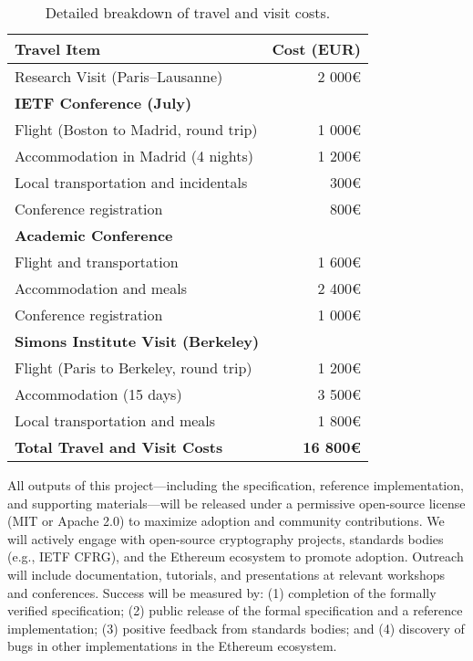 \documentclass{article}
\begin{document}
\begin{table}[t]
    \centering
    \caption{Detailed breakdown of travel and visit costs.}
    \begin{tabular}{|l|r|}
        \hline
        \textbf{Travel Item} & \textbf{Cost (EUR)} \\
        \hline\hline
        Research Visit (Paris--Lausanne) & 2 000\euro{} \\
        \hline
        \multicolumn{2}{|l|}{\textbf{IETF Conference (July)}} \\
        \hline
        Flight (Boston to Madrid, round trip) & 1 000\euro{} \\
        Accommodation in Madrid (4 nights) & 1 200\euro{} \\
        Local transportation and incidentals & 300\euro{} \\
        Conference registration & 800\euro{} \\
        \hline
        \multicolumn{2}{|l|}{\textbf{Academic Conference}} \\
        \hline
        Flight and transportation & 1 600\euro{} \\
        Accommodation and meals & 2 400\euro{} \\
        Conference registration & 1 000\euro{} \\
        \hline
        \multicolumn{2}{|l|}{\textbf{Simons Institute Visit (Berkeley)}} \\
        \hline
        Flight (Paris to Berkeley, round trip) & 1 200\euro{} \\
        Accommodation (15 days) & 3 500\euro{} \\
        Local transportation and meals & 1 800\euro{} \\
        \hline\hline
        \rowcolor{lightgray}
        \textbf{Total Travel and Visit Costs} & \textbf{16 800\euro{}} \\
        \hline
    \end{tabular}
\end{table}

 All outputs of this project—including the specification, reference implementation, and supporting materials—will be released under a permissive open-source license (MIT or Apache 2.0) to maximize adoption and community contributions. We will actively engage with open-source cryptography projects, standards bodies (e.g., IETF CFRG), and the Ethereum ecosystem to promote adoption. Outreach will include documentation, tutorials, and presentations at relevant workshops and conferences. Success will be measured by: (1) completion of the formally verified specification; (2) public release of the formal specification and a reference implementation; (3) positive feedback from standards bodies; and (4) discovery of bugs in other implementations in the Ethereum ecosystem.
\end{document}
